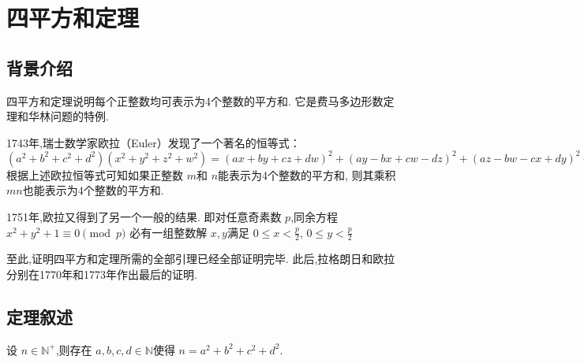 \documentclass[main]{subfiles}
\begin{document}
\renewcommand{\filename}{No.10Theorem}%
\section{四平方和定理}
\subsection{背景介绍}
四平方和定理说明每个正整数均可表示为4个整数的平方和.
它是费马多边形数定理和华林问题的特例.

1743年,瑞士数学家欧拉（Euler）发现了一个著名的恒等式：
\((a^2+b^2+c^2+d^2)(x^2+y^2+z^2+w^2)=(ax+by+cz+dw)^2+(ay-bx+cw-dz)^2+(az-bw-cx+dy)^2+(aw+bz-cy-dx)^2\)
根据上述欧拉恒等式可知如果正整数 \(m\)和 \(n\)能表示为4个整数的平方和,
则其乘积 \(mn\)也能表示为4个整数的平方和.

1751年,欧拉又得到了另一个一般的结果.
即对任意奇素数 \(p\),同余方程
\(x^2+y^2+1 \equiv 0\pmod p\)
必有一组整数解 \(x,y\)满足 \(0 \le x<\frac{p}{2}\), \(0 \le y<\frac{p}{2}\)

至此,证明四平方和定理所需的全部引理已经全部证明完毕.
此后,拉格朗日和欧拉分别在1770年和1773年作出最后的证明.

\subsection{定理叙述}
\begin{theorem}\label{the:1}
  设 \(n \in \mathbb{N}^+\),则存在 \(a,b,c,d \in \mathbb{N}\)使得 \(n=a^2 +b^2 + c^2 + d^2\).
\end{theorem}
\end{document}
